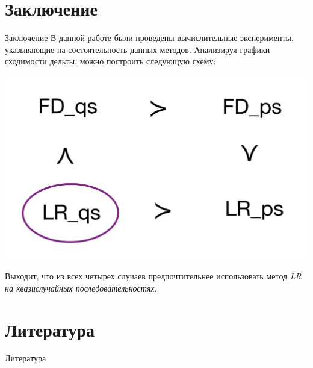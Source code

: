 \documentclass[aspectratio=169]{beamer}
\begin{document}
    \section{Заключение}
    \begin{frame}{Заключение}
         В данной работе были проведены вычислительные эксперименты, указывающие на состоятельность данных методов. Анализируя графики сходимости дельты, можно построить следующую схему: 
\begin{center}
    \includegraphics[width=.5\linewidth]{methods.jpg} 
\end{center}

Выходит, что из всех четырех случаев предпочтительнее использовать метод \textit{LR на квазислучайных последовательностях}.

    \end{frame}
    \section{Литература}
    \begin{frame}{Литература}
    
    \nocite{*}
    \printbibliography
   
    \end{frame}


 
\end{document}
